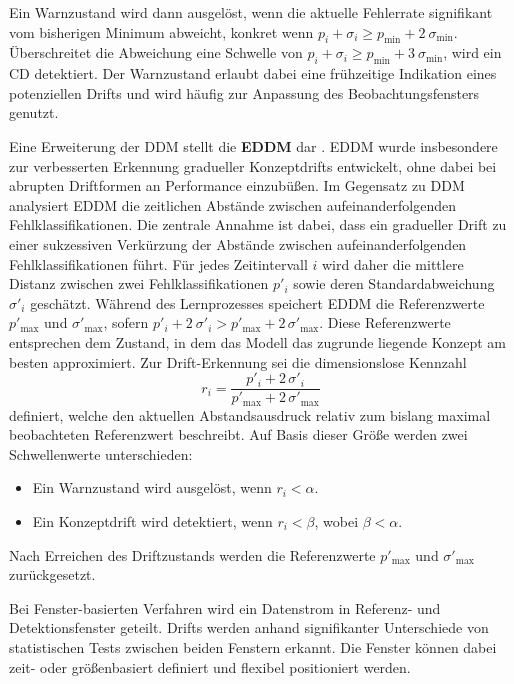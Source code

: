 Ein Warnzustand wird dann ausgelöst, wenn die aktuelle Fehlerrate signifikant vom bisherigen Minimum abweicht, konkret wenn $p_i+\sigma_i\ge p_{\mathrm{min}} + 2 \ \sigma_{\mathrm{min}}$. Überschreitet die Abweichung eine Schwelle von $p_i+\sigma_i \ge p_{\mathrm{min}} + 3 \ \sigma_{\mathrm{min}}$, wird ein \ac{CD} detektiert. Der Warnzustand erlaubt dabei eine frühzeitige Indikation eines potenziellen Drifts und wird häufig zur Anpassung des Beobachtungsfensters genutzt. \par
Eine Erweiterung der \ac{DDM} stellt die \textbf{\ac{EDDM}} dar \cite{baena.2006}. \ac{EDDM} wurde insbesondere zur verbesserten Erkennung gradueller Konzeptdrifts entwickelt, ohne dabei bei abrupten Driftformen an Performance einzubüßen. Im Gegensatz zu \ac{DDM} analysiert \ac{EDDM} die zeitlichen Abstände zwischen aufeinanderfolgenden Fehlklassifikationen. Die zentrale Annahme ist dabei, dass ein gradueller Drift zu einer sukzessiven Verkürzung der Abstände zwischen aufeinanderfolgenden Fehlklassifikationen führt.
Für jedes Zeitintervall $i$ wird daher die mittlere Distanz zwischen zwei Fehlklassifikationen $p'_i$ sowie deren Standardabweichung $\sigma'_i$ geschätzt. Während des Lernprozesses speichert \ac{EDDM} die Referenzwerte $p'_{\max}$ und $\sigma'_{\max}$, sofern $p'_i + 2 \ \sigma'_i > p'_{\max} + 2\,\sigma'_{\max}$. Diese Referenzwerte entsprechen dem Zustand, in dem das Modell das zugrunde liegende Konzept am besten approximiert.
Zur Drift-Erkennung sei die dimensionslose Kennzahl
%
\begin{equation}
    \label{eq:eddm_ratio}
    r_i = \frac{p'_i + 2\,\sigma'_i}{p'_{\max} + 2\,\sigma'_{\max}}
\end{equation}
%
definiert, welche den aktuellen Abstandsausdruck relativ zum bislang maximal beobachteten Referenzwert beschreibt. Auf Basis dieser Größe werden zwei Schwellenwerte unterschieden:
%
\begin{itemize}
    \item Ein Warnzustand wird ausgelöst, wenn $r_i < \alpha$.
    \item Ein Konzeptdrift wird detektiert, wenn $r_i < \beta$, wobei $\beta < \alpha$.
\end{itemize}
%
Nach Erreichen des Driftzustands werden die Referenzwerte $p'_{\max}$ und $\sigma'_{\max}$ zurückgesetzt.
\par
Bei Fenster-basierten Verfahren wird ein Datenstrom in Referenz- und Detektionsfenster geteilt. Drifts werden anhand signifikanter Unterschiede von statistischen Tests zwischen beiden Fenstern erkannt. Die Fenster können dabei zeit- oder größenbasiert definiert und flexibel positioniert werden.
